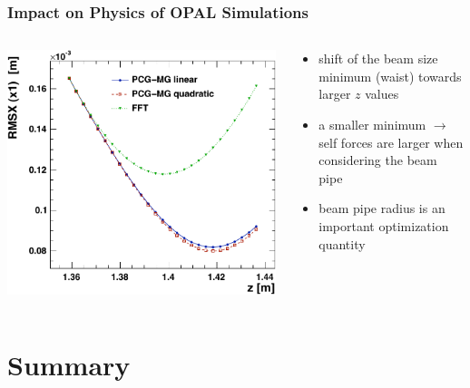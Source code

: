 \documentclass[xcolor=pdftex,table,10pt]{beamer}
\newcommand{\opal}{\textsc{OPAL }}
\begin{document}
    \begin{frame}
		\frametitle{Impact on Physics of \opal Simulations}
	
		\begin{columns}
		\begin{column}{6.5cm}
            \centering
		    \includegraphics[width=0.99\textwidth]{plots/fft-drift-mg-drift-small-RMSX-x-SPOS-crop.pdf}
        \end{column}
        \begin{column}{4.5cm}
            \begin{itemize} 
                \item shift of the beam size minimum (waist) towards larger $z$ values
                \item a {\color{red!60}smaller minimum} $\rightarrow$ self forces are larger when considering the beam pipe
                \item beam pipe radius is an important optimization quantity
            \end{itemize}
        \end{column}
        \end{columns}

	\end{frame}


    \section{Summary}
\end{document}
